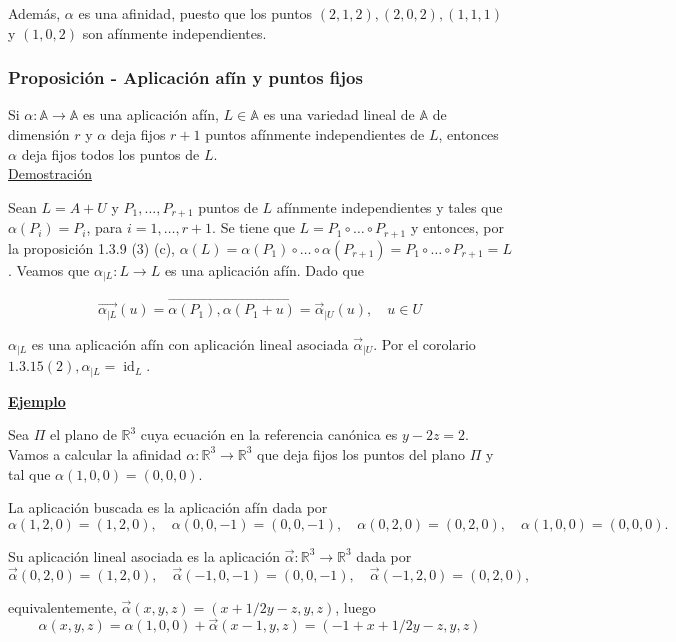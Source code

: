 \documentclass[12pt, a4paper, ones, notitlepage, openany,titlepage]{article}
\newcommand{\demostracion}{\noindent\underline{Demostración}}
\newcommand{\ejemplo}{\noindent\underline{\textbf{Ejemplo}}}
\begin{document}
Además, $\alpha$ es una afinidad, puesto que los puntos $(2,1,2),(2,0,2),(1,1,1)$ y $(1,0,2)$ son afínmente independientes.

\subsubsection{Proposición - Aplicación afín y puntos fijos}
Si $\alpha: \mathbb{A} \rightarrow \mathbb{A}$ es una aplicación afín, $L\in\mathbb{A}$ es una variedad lineal de $\mathbb{A}$ de dimensión $r$ y $\alpha$ deja fijos $r+1$ puntos afínmente independientes de $L$, entonces $\alpha$ deja fijos todos los puntos de $L$.\\

\demostracion

Sean $L=A+U$ y $P_{1}, \ldots, P_{r+1}$ puntos de $L$ afínmente independientes y tales que $\alpha\left(P_{i}\right)=P_{i}$, para $i=1, \ldots, r+1$. Se tiene que $L=P_{1} \circ \ldots \circ P_{r+1}$ y entonces, por la proposición 1.3.9 (3) (c), $\alpha(L)=\alpha\left(P_{1}\right) \circ \ldots \circ \alpha\left(P_{r+1}\right)=P_{1} \circ \ldots \circ P_{r+1}=L$. Veamos que $\alpha_{\mid L}: L \rightarrow L$ es una aplicación afín. Dado que

$$
\overrightarrow{\alpha_{\mid L}}(u)=\overrightarrow{\alpha\left(P_{1}\right), \alpha\left(P_{1}+u\right)}=\vec{\alpha}_{\mid U}(u), \quad u \in U
$$

$\alpha_{\mid L}$ es una aplicación afín con aplicación lineal asociada $\vec{\alpha}_{\mid U}$. Por el corolario $1.3 .15(2), \alpha_{\mid L}=\operatorname{id}_{L}$.

\ejemplo

Sea $\Pi$ el plano de $\mathbb{R}^{3}$ cuya ecuación en la referencia canónica es $y-2 z=2$. Vamos a calcular la afinidad $\alpha: \mathbb{R}^{3} \rightarrow \mathbb{R}^{3}$ que deja fijos los puntos del plano $\Pi$ y tal que $\alpha(1,0,0)=(0,0,0)$.

\noindent La aplicación buscada es la aplicación afín dada por
$$
\alpha(1,2,0)=(1,2,0), \quad \alpha(0,0,-1)=(0,0,-1), \quad \alpha(0,2,0)=(0,2,0), \quad \alpha(1,0,0)=(0,0,0) .
$$

\noindent Su aplicación lineal asociada es la aplicación $\vec{\alpha}: \mathbb{R}^{3} \rightarrow \mathbb{R}^{3}$ dada por
$$
\vec{\alpha}(0,2,0)=(1,2,0), \quad \vec{\alpha}(-1,0,-1)=(0,0,-1), \quad \vec{\alpha}(-1,2,0)=(0,2,0),
$$

\noindent equivalentemente, $\vec{\alpha}(x, y, z)=(x+1 / 2 y-z, y, z)$, luego
$$
\alpha(x, y, z)=\alpha(1,0,0)+\vec{\alpha}(x-1, y, z)=(-1+x+1 / 2 y-z, y, z)
$$
\end{document}
